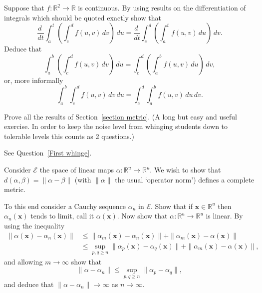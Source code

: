 \begin{question}
Suppose that $f:{\mathbb R}^{2}\rightarrow{\mathbb R}$
is continuous. By using results on the differentiation
of integrals which should be quoted exactly show that
\[\frac{d\ }{dt}\int_{a}^{t}
\left(\int_{c}^{d}f(u,v)\,dv\right)\,du
=\frac{d\ }{dt}\int_{c}^{d}
\left(\int_{a}^{t}f(u,v)\,du\right)\,dv.\]
Deduce that
\[\int_{a}^{b}
\left(\int_{c}^{d}f(u,v)\,dv\right)\,du
=\int_{c}^{d}
\left(\int_{a}^{b}f(u,v)\,du\right)\,dv,\]
or, more informally
\[\int_{a}^{b}
\int_{c}^{d}f(u,v)\,dv\,du
=\int_{c}^{d}
\int_{a}^{b}f(u,v)\,du\,dv.\]

\end{question}
\begin{question}\label{First whinge}
Prove all the results of Section~\ref{section metric}.
(A long but easy and useful exercise. In order to keep the
noise level from whinging students down to tolerable
levels this counts as 2 questions.)
\end{question}
\begin{question}
See Question~\ref{First whinge}.
\end{question}
\begin{question}\label{3.10}
Consider ${\mathcal E}$ the space of linear
maps $\alpha:{\mathbb R}^{u}\rightarrow{\mathbb R}^{u}$.
We wish to show that $d(\alpha,\beta)=\|\alpha -\beta\|$
(with $\|\alpha\|$ the usual `operator norm') defines
a complete metric. 

To this end consider a Cauchy sequence $\alpha_{n}$ in
${\mathcal E}$. Show that if $\mathbf{x}\in{\mathbb R}^{u}$
then $\alpha_{n}(\mathbf{x})$ tends to limit, call it
$\alpha(\mathbf{x})$. Now show that 
$\alpha:{\mathbb R}^{u}\rightarrow{\mathbb R}^{u}$
is linear. By using the inequality
\begin{align*}
\|\alpha(\mathbf{x})-\alpha_{n}(\mathbf{x})\|&
\leq\|\alpha_{m}(\mathbf{x})-\alpha_{n}(\mathbf{x})\|
+\|\alpha_{m}(\mathbf{x})-\alpha(\mathbf{x})\|\\
&\leq\sup_{p,q\geq n}\|\alpha_{p}(\mathbf{x})-\alpha_{q}(\mathbf{x})\|
+\|\alpha_{m}(\mathbf{x})-\alpha(\mathbf{x})\|,
\end{align*}
and allowing $m\rightarrow\infty$ show that
\[\|\alpha-\alpha_{n}\|\leq\sup_{p,q\geq n}\|\alpha_{p}-\alpha_{q}\|,\]
and deduce that $\|\alpha-\alpha_{n}\|\rightarrow\infty$
as $n\rightarrow\infty$.

\end{question}

